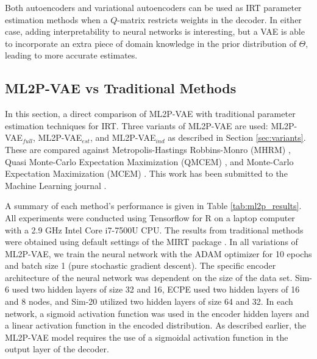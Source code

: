 Both autoencoders and variational autoencoders can be used as IRT parameter estimation methods when a $Q$-matrix restricts weights in the decoder. In either case, adding interpretability to neural networks is interesting, but a VAE is able to incorporate an extra piece of domain knowledge in the prior distribution of $\Theta$, leading to more accurate estimates.


\subsection{ML2P-VAE vs Traditional Methods}
In this section, a direct comparison of ML2P-VAE with traditional parameter estimation techniques for IRT. Three variants of ML2P-VAE are used: ML2P-VAE$_{full}$, ML2P-VAE$_{est}$, and ML2P-VAE$_{ind}$ as described in Section \ref{sec:variants}. These are compared against Metropolis-Hastings Robbins-Monro (MHRM) \cite{cai2009}, Quasi Monte-Carlo Expectation Maximization (QMCEM) \cite{mirt}, and Monte-Carlo Expectation Maximization (MCEM) \cite{bock1981}. This work has been submitted to the Machine Learning journal \cite{ml_paper}. 

A summary of each method's performance is given in Table \ref{tab:ml2p_results}. All experiments were conducted using Tensorflow for R on a laptop computer with a 2.9 GHz Intel Core i7-7500U CPU. The results from traditional methods were obtained using default settings of the MIRT package \cite{mirt}. 
In all variations of ML2P-VAE, we train the neural network with the ADAM optimizer for 10 epochs and batch size 1 (pure stochastic gradient descent). The specific encoder architecture of the neural network was dependent on the size of the data set. Sim-6 used two hidden layers of size 32 and 16, ECPE used two hidden layers of 16 and 8 nodes, and Sim-20 utilized two hidden layers of size 64 and 32. In each network, a sigmoid activation function was used in the encoder hidden layers and a linear activation function in the encoded distribution. As described earlier, the ML2P-VAE model requires the use of a sigmoidal activation function in the output layer of the decoder.

